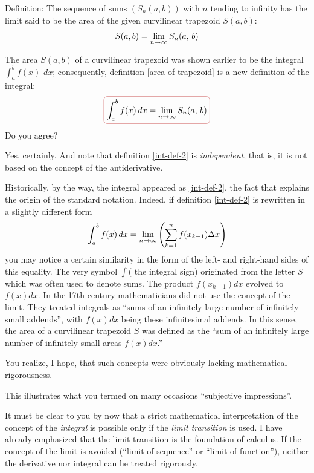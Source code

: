 \begin{mytheo}{Definition:}
The sequence of sums $(S_{n} (a, b))$ with $n$ tending to infinity has the limit said to be the area of the given curvilinear trapezoid $S (a, b)$:
\begin{equation}%
S(a,b)= \lmts{n}{\infty} S_{n} (a, \, b)
\label{area-of-trapezoid}
\end{equation}
\end{mytheo}

\rdr The area $S (a, b)$ of a curvilinear trapezoid was shown earlier to be the integral $\displaystyle\int_{a}^{b} f(x) \,\, dx$; consequently, definition \eqref{area-of-trapezoid} is a new definition of the integral:
\begin{equation}%
\boxed{\int_{a}^{b} f(x) \, dx = \lmts{n}{\infty} S_{n} (a, \, b)}
\label{int-def-2}
\end{equation}
Do you agree? 

\athr Yes, certainly. And note that definition \eqref{int-def-2}
is \emph{independent}, that is, it is not based on the concept of the antiderivative.

Historically, by the way, the integral appeared as \eqref{int-def-2}, the fact that explains the origin of the standard notation. Indeed, if definition \eqref{int-def-2} is rewritten in a slightly different form
\begin{equation}%
\int_{a}^{b} f(x) \, dx = \lmts{n}{\infty} \left( \sum_{k=1}^{n} f(x_{k-1}) \Delta x \right)
\label{int-def-3}
\end{equation}
you may notice a certain similarity in the form of the left- and right-hand sides of this equality. The very symbol $\int$( the integral sign) originated from the letter $S$ which was often used to denote sums. The product $f(x_{k-1}) dx$ evolved to $f (x) dx$. In the 17th century mathematicians did not use the concept of the limit. They treated integrals as ``sums of an infinitely large number of infinitely small addends'', with $f (x) dx$ being these infinitesimal addends. In this sense, the area of a curvilinear trapezoid $S$ was defined as the ``sum of an infinitely large number of infinitely small areas $f (x) dx$.''

You realize, I hope, that such concepts were obviously lacking mathematical rigorousness.

\rdr This illustrates what you termed on many occasions ``subjective impressions''.

\athr It must be clear to you by now that a strict mathematical interpretation of the concept of the \emph{integral} is possible only if the \emph{limit transition} is used. I have already emphasized that the limit transition is the foundation of calculus. If the concept of the limit is avoided (``limit of sequence'' or ``limit of function''), neither the derivative nor integral can he treated rigorously.

